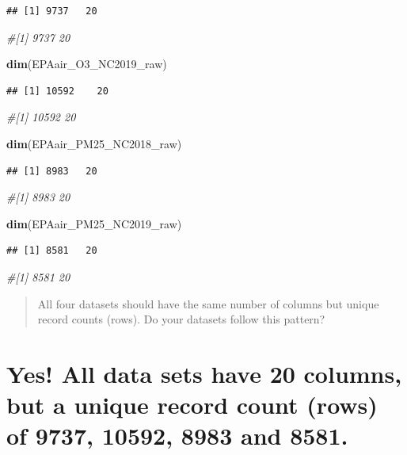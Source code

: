 \documentclass[
]{article}
\newenvironment{Shaded}{\begin{snugshade}}{\end{snugshade}}
\newcommand{\CommentTok}[1]{\textcolor[rgb]{0.56,0.35,0.01}{\textit{#1}}}
\newcommand{\FunctionTok}[1]{\textcolor[rgb]{0.13,0.29,0.53}{\textbf{#1}}}
\newcommand{\NormalTok}[1]{#1}
\begin{document}
\begin{verbatim}
## [1] 9737   20
\end{verbatim}

\begin{Shaded}
\begin{Highlighting}[]
\CommentTok{\#[1] 9737   20}

\FunctionTok{dim}\NormalTok{(EPAair\_O3\_NC2019\_raw)}
\end{Highlighting}
\end{Shaded}

\begin{verbatim}
## [1] 10592    20
\end{verbatim}

\begin{Shaded}
\begin{Highlighting}[]
\CommentTok{\#[1] 10592    20}

\FunctionTok{dim}\NormalTok{(EPAair\_PM25\_NC2018\_raw)}
\end{Highlighting}
\end{Shaded}

\begin{verbatim}
## [1] 8983   20
\end{verbatim}

\begin{Shaded}
\begin{Highlighting}[]
\CommentTok{\#[1] 8983   20}

\FunctionTok{dim}\NormalTok{(EPAair\_PM25\_NC2019\_raw)}
\end{Highlighting}
\end{Shaded}

\begin{verbatim}
## [1] 8581   20
\end{verbatim}

\begin{Shaded}
\begin{Highlighting}[]
\CommentTok{\#[1] 8581   20}
\end{Highlighting}
\end{Shaded}

\begin{quote}
All four datasets should have the same number of columns but unique
record counts (rows). Do your datasets follow this pattern?
\end{quote}

\section{Yes! All data sets have 20 columns, but a unique record count
(rows) of 9737, 10592, 8983 and
8581.}\label{yes-all-data-sets-have-20-columns-but-a-unique-record-count-rows-of-9737-10592-8983-and-8581.}
\end{document}
